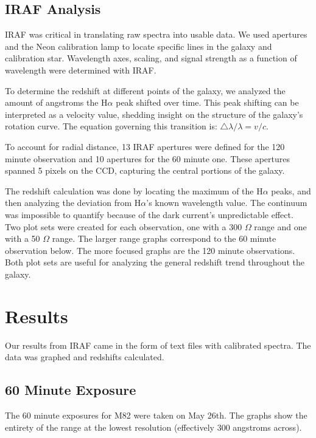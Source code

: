\documentclass[useAMS,usenatbib]{mn2e}
\begin{document}
\subsection*{IRAF Analysis}

IRAF was critical in translating raw spectra into usable data. We used apertures and the Neon calibration lamp to locate specific lines in the galaxy and calibration star. Wavelength axes, scaling, and signal strength as a function of wavelength were determined with IRAF.\par

To determine the redshift at different points of the galaxy, we analyzed the amount of angstroms the H$\alpha$ peak shifted over time. This peak shifting can be interpreted as a velocity value, shedding insight on the structure of the galaxy's rotation curve. The equation governing this transition is: $\bigtriangleup\lambda / \lambda = v / c $. 

	To account for radial distance, 13 IRAF apertures were defined for the 120 minute observation and 10 apertures for the 60 minute one. These apertures spanned 5 pixels on the CCD, capturing the central portions of the galaxy.

	The redshift calculation was done by locating the maximum of the H$\alpha$ peaks, and then analyzing the deviation from H$\alpha$'s known wavelength value. The continuum was impossible to quantify because of the dark current's unpredictable effect. Two plot sets were created for each observation, one with a 300 $\Omega$ range and one with a 50 $\Omega$ range. The larger range graphs correspond to the 60 minute observation below. The more focused graphs are the 120 minute observations. Both plot sets are useful for analyzing the general redshift trend throughout the galaxy.

\section*{Results}

Our results from IRAF came in the form of text files with calibrated spectra. The data was graphed and redshifts calculated.

\subsection*{60 Minute Exposure}
The 60 minute exposures for M82 were taken on May 26th. The graphs show the entirety of the range at the lowest resolution (effectively 300 angstroms across). 
\end{document}

